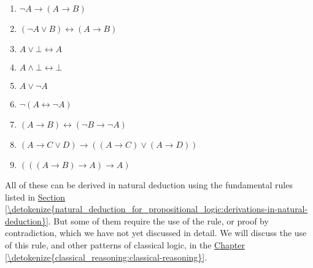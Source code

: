 \documentclass[letterpaper,10pt,english]{sphinxmanual}
\begin{document}
\begin{enumerate}
\item {} 
\sphinxAtStartPar
\(\neg A \to (A \to B)\)

\item {} 
\sphinxAtStartPar
\((\neg A \vee B) \leftrightarrow (A \to B)\)

\item {} 
\sphinxAtStartPar
\(A \vee \bot \leftrightarrow A\)

\item {} 
\sphinxAtStartPar
\(A \wedge \bot \leftrightarrow \bot\)

\item {} 
\sphinxAtStartPar
\(A \vee \neg A\)

\item {} 
\sphinxAtStartPar
\(\neg (A \leftrightarrow \neg A)\)

\item {} 
\sphinxAtStartPar
\((A \to B) \leftrightarrow (\neg B \to \neg A)\)

\item {} 
\sphinxAtStartPar
\((A \to C \vee D) \to ((A \to C) \vee (A \to D))\)

\item {} 
\sphinxAtStartPar
\((((A \to B) \to A) \to A)\)

\end{enumerate}

\sphinxAtStartPar
All of these can be derived in natural deduction using the fundamental rules listed in \hyperref[\detokenize{natural_deduction_for_propositional_logic:derivations-in-natural-deduction}]{Section \ref{\detokenize{natural_deduction_for_propositional_logic:derivations-in-natural-deduction}}}. But some of them require the use of the  rule, or proof by contradiction, which we have not yet discussed in detail. We will discuss the use of this rule, and other patterns of classical logic, in the \hyperref[\detokenize{classical_reasoning:classical-reasoning}]{Chapter \ref{\detokenize{classical_reasoning:classical-reasoning}}}.
\end{document}
